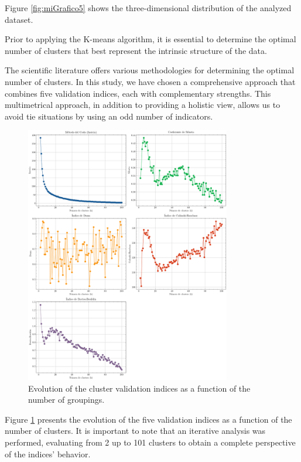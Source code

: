 \documentclass[10pt]{article}
\begin{document}
Figure \ref{fig:miGrafico5} shows the three-dimensional distribution of the analyzed dataset.

Prior to applying the K-means algorithm, it is essential to determine the optimal number of clusters that best represent the intrinsic structure of the data.

The scientific literature offers various methodologies for determining the optimal number of clusters. In this study, we have chosen a comprehensive approach that combines five validation indices, each with complementary strengths. This multimetrical approach, in addition to providing a holistic view, allows us to avoid tie situations by using an odd number of indicators.

\begin{figure}[p]
    \centering
    \includegraphics[width=0.8\textwidth]{plots_investing/Grafico 6.png}
    \caption{Evolution of the cluster validation indices as a function of the number of groupings.}
    \label{fig:miGrafico6}
\end{figure}

Figure \ref{fig:miGrafico6} presents the evolution of the five validation indices as a function of the number of clusters. It is important to note that an iterative analysis was performed, evaluating from 2 up to 101 clusters to obtain a complete perspective of the indices’ behavior.
\end{document}
